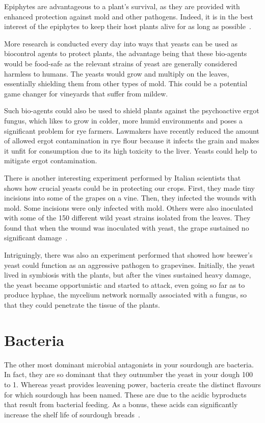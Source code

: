 Epiphytes are advantageous to a plant's survival, as they are provided with
enhanced protection against mold and other pathogens. Indeed, it is in the
best interest of the epiphytes to keep their host plants alive for as long as
possible~\cite{leaf+surface+sugars+epiphytes}.

More research is conducted every day into ways that yeasts can be used as
biocontrol agents to protect plants, the advantage being that these bio-agents
would be food-safe as the relevant strains of yeast are generally considered
harmless to humans. The yeasts would grow and multiply on the leaves,
essentially shielding them from other types of mold. This could be a potential
game changer for vineyards that suffer from mildew.

Such bio-agents could also be used to shield plants against the psychoactive
ergot fungus, which likes to grow in colder, more humid environments and
poses a significant problem for rye farmers.
Lawmakers have recently reduced the amount of allowed ergot contamination in
rye flour because it infects the grain and makes it unfit for consumption due
to its high toxicity to the liver. Yeasts could help to mitigate ergot contamination.

There is another interesting experiment performed by Italian scientists that
shows how crucial yeasts could be in protecting our crops. First, they made
tiny incisions into some of the grapes on a vine. Then, they infected the
wounds with mold. Some incisions were only infected with mold. Others were also
inoculated with some of the 150 different wild yeast strains isolated from the
leaves. They found that when the wound was inoculated with yeast, the grape
sustained no significant damage~\cite{yeasts+biocontrol+agent}.

Intriguingly, there was also an experiment performed that showed how brewer's
yeast could function as an aggressive pathogen to grapevines. Initially, the
yeast lived in symbiosis with the plants, but after the vines sustained heavy
damage, the yeast became opportunistic and started to attack, even going so far
as to produce hyphae, the mycelium network normally associated with a fungus,
so that they could penetrate the tissue of the plants.

\section{Bacteria}

The other most dominant microbial antagonists in your sourdough are bacteria.
In fact, they are so dominant that they outnumber the yeast in your dough 100
to 1. Whereas yeast provides leavening power, bacteria create the distinct
flavours for which sourdough has been named. These are due to the acidic
byproducts that result from bacterial feeding. As a bonus, these acids
can significantly increase the shelf life of sourdough
breads~\cite{shelflife+acidity}.

